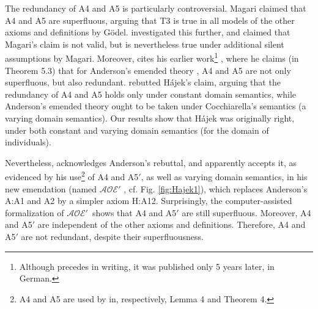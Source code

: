 \documentclass{birkjour}
\newcommand{\AOEH}{$\mathcal{AOE}'$}
\theoremstyle{definition}
\theoremstyle{remark}
\numberwithin{equation}{section}
\begin{document}
The redundancy of A4 and A5 is particularly controversial. Magari
\cite{Magari1988} claimed that A4 and A5 are superfluous, arguing that T3 is true in all
models of the other axioms and definitions by Gödel.
\citet[pp.~5--6]{Hajek_Magari_and_others_1996} investigated this
further, and claimed that Magari's claim is not valid, but is
nevertheless true  under additional silent assumptions by Magari.
Moreover, \citet[p.~2]{Hajek_Magari_and_others_1996} cites his earlier
work\footnote{Although \citep{Hajek_der_Mathematiker_2001} precedes
\citep{Hajek_Magari_and_others_1996} in writing, it was published only
5 years later, in German.} \citep{Hajek_der_Mathematiker_2001}, where
he claims (in Theorem 5.3) that for Anderson's emended theory
\citep{anderson90:_some_emend_of_goedel_ontol_proof}, A4 and A5 are
not only superfluous, but also redundant. \citet[footnote 1 in
p.~1]{AndersonGettings} rebutted Hájek's claim,
arguing that the redundancy of A4 and A5 holds only under constant
domain semantics, while Anderson's emended theory ought to be taken
under Cocchiarella's semantics \citep{Cocchiarella} (a varying domain
semantics). Our results show that Hájek was originally right, under
both constant and varying domain semantics (for the domain of individuals).

Nevertheless, \citet[p.~7]{Hajek2002} acknowledges Anderson's rebuttal,
and apparently accepts it, as evidenced by his use\footnote{
  A4 and A5 are used by \citet[p.~11]{Hajek2002} in,
  respectively, Lemma 4 and Theorem 4.
}
of A4 and A5$'$, as well as varying domain semantics, in his new
emendation (named \AOEH\/ \citep[sec.~4]{Hajek2002}, cf. Fig.
\ref{fig:Hajek1}), which replaces Anderson's A:A1 and A2 by a simpler
axiom H:A12. Surprisingly, the computer-assisted formalization of
\AOEH\ shows that A4 and A5$'$ are still superfluous. Moreover,
A4 and A5$'$ are independent
of the other axioms and definitions.
Therefore, A4 and A5$'$ are not redundant, despite their superfluousness.
\end{document}
